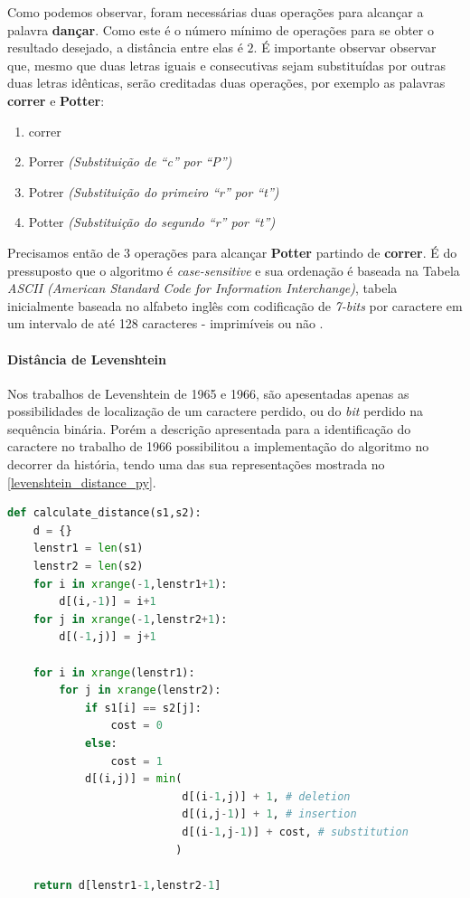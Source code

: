 Como podemos observar, foram necessárias duas operações para alcançar a palavra \textbf{dançar}. Como este é o número mínimo de operações para se obter o resultado desejado, a distância entre elas é $2$.
É importante observar observar que, mesmo que duas letras iguais e consecutivas sejam substituídas por outras duas letras idênticas, serão creditadas duas operações, por exemplo as palavras \textbf{correr} e \textbf{Potter}:

\begin{enumerate}[start=0]
	\item correr
	\item Porrer \textit{(Substituição de ``c'' por ``P'')}
	\item Potrer \textit{(Substituição do primeiro ``r'' por ``t'')}
	\item Potter \textit{(Substituição do segundo ``r'' por ``t'')}
\end{enumerate}

Precisamos então de 3 operações para alcançar \textbf{Potter} partindo de \textbf{correr}. É do pressuposto que o algoritmo é \textit{case-sensitive} e sua ordenação é baseada na Tabela \textit{ASCII (American Standard Code for Information Interchange)}, tabela inicialmente baseada no alfabeto inglês com codificação de \textit{7-bits} por caractere em um intervalo de até 128 caracteres - imprimíveis ou não \cite{shirey2007rfc}.


\paragraph*{Distância de Levenshtein}
\label{sub:algoritmo_da_distancia}

Nos trabalhos de Levenshtein de 1965 e 1966, são apesentadas apenas as possibilidades de localização de um caractere perdido, ou do \textit{bit} perdido na sequência binária. Porém a descrição apresentada para a identificação do caractere no trabalho de 1966 \cite{levenshtein1966} possibilitou a implementação do algoritmo no decorrer da história, tendo uma das sua representações mostrada no \autoref{levenshtein_distance_py}.

\begin{lstlisting}[language=Python,label=levenshtein_distance_py,caption={Implementação da distância de Levenshtein}]
def calculate_distance(s1,s2):
    d = {}
    lenstr1 = len(s1)
    lenstr2 = len(s2)
    for i in xrange(-1,lenstr1+1):
        d[(i,-1)] = i+1
    for j in xrange(-1,lenstr2+1):
        d[(-1,j)] = j+1
 
    for i in xrange(lenstr1):
        for j in xrange(lenstr2):
            if s1[i] == s2[j]:
                cost = 0
            else:
                cost = 1
            d[(i,j)] = min(
                           d[(i-1,j)] + 1, # deletion
                           d[(i,j-1)] + 1, # insertion
                           d[(i-1,j-1)] + cost, # substitution
                          )

    return d[lenstr1-1,lenstr2-1]
\end{lstlisting}

